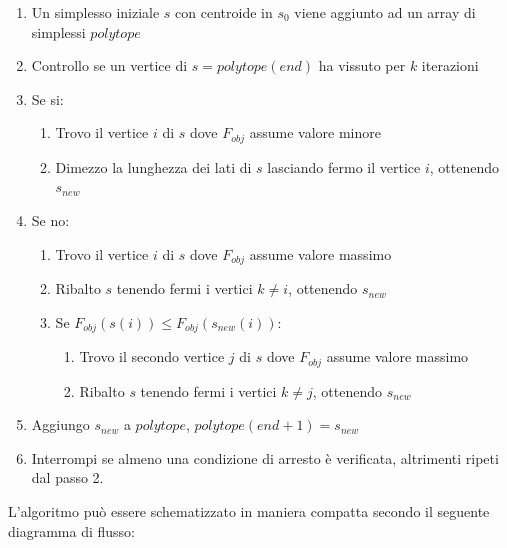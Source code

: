 \documentclass[a4paper, 11pt]{article}
\begin{document}
\begin{enumerate}
\item Un simplesso iniziale $s$ con centroide in $s_{0}$ viene aggiunto ad un
array di simplessi $polytope$
\item Controllo se un vertice di $s = polytope(end)$ ha vissuto per $k$
iterazioni
\item Se si:
\begin{enumerate}
\item Trovo il vertice $i$ di $s$ dove $F_{obj}$ assume valore minore
\item Dimezzo la lunghezza dei lati di $s$ lasciando fermo il vertice $i$,
ottenendo $s_{new}$
\end{enumerate}
\item Se no:
\begin{enumerate}
\item Trovo il vertice $i$ di $s$ dove $F_{obj}$ assume valore massimo
\item Ribalto $s$ tenendo fermi i vertici $k \ne i$, ottenendo $s_{new}$
\item Se $F_{obj}(s(i)) \leq F_{obj}(s_{new}(i))$:
\begin{enumerate}
\item Trovo il secondo vertice $j$ di $s$ dove $F_{obj}$ assume valore massimo
\item Ribalto $s$ tenendo fermi i vertici $k \ne j$, ottenendo $s_{new}$
\end{enumerate}
\end{enumerate}
\item Aggiungo $s_{new}$ a $polytope$, $polytope(end+1) = s_{new}$
\item Interrompi se almeno una condizione di arresto è verificata, altrimenti
ripeti dal passo 2.
\end{enumerate}

\noindent
L'algoritmo può essere schematizzato in maniera compatta secondo il seguente
diagramma di flusso:
\end{document}
